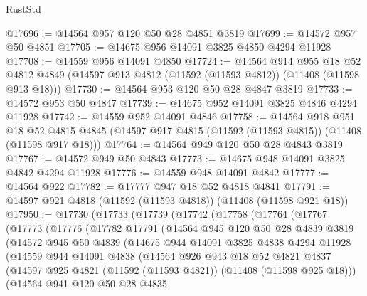 \begin{lexlean}{RustStd}
\begin{coremodule}
@17696 := @14564 @957 @120 @50 @28 @4851 @3819
@17699 := @14572 @957 @50 @4851
@17705 := @14675 @956 @14091 @3825 @4850 @4294 @11928
@17708 := @14559 @956 @14091 @4850
@17724 := @14564
    @914
    @955
    @18
    @52
    @4812
    @4849
    (@14597 @913 @4812 (@11592 (@11593 @4812)) (@11408 (@11598 @913 @18)))
@17730 := @14564 @953 @120 @50 @28 @4847 @3819
@17733 := @14572 @953 @50 @4847
@17739 := @14675 @952 @14091 @3825 @4846 @4294 @11928
@17742 := @14559 @952 @14091 @4846
@17758 := @14564
    @918
    @951
    @18
    @52
    @4815
    @4845
    (@14597 @917 @4815 (@11592 (@11593 @4815)) (@11408 (@11598 @917 @18)))
@17764 := @14564 @949 @120 @50 @28 @4843 @3819
@17767 := @14572 @949 @50 @4843
@17773 := @14675 @948 @14091 @3825 @4842 @4294 @11928
@17776 := @14559 @948 @14091 @4842
@17777 := @14564 @922
@17782 := @17777 @947 @18 @52 @4818 @4841
@17791 := @14597 @921 @4818 (@11592 (@11593 @4818)) (@11408 (@11598 @921 @18))
@17950 := @17730
    (@17733
      (@17739
        (@17742
          (@17758
            (@17764
              (@17767
                (@17773
                  (@17776
                    (@17782
                      @17791
                      (@14564
                        @945
                        @120
                        @50
                        @28
                        @4839
                        @3819
                        (@14572
                          @945
                          @50
                          @4839
                          (@14675
                            @944
                            @14091
                            @3825
                            @4838
                            @4294
                            @11928
                            (@14559
                              @944
                              @14091
                              @4838
                              (@14564
                                @926
                                @943
                                @18
                                @52
                                @4821
                                @4837
                                (@14597
                                  @925
                                  @4821
                                  (@11592 (@11593 @4821))
                                  (@11408 (@11598 @925 @18)))
                                (@14564
                                  @941
                                  @120
                                  @50
                                  @28
                                  @4835

\end{coremodule}
\end{lexlean}
